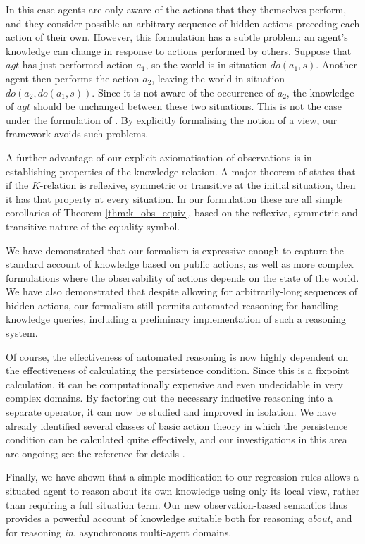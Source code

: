 In this case agents are only aware of the actions that they themselves
perform, and they consider possible an arbitrary sequence of hidden
actions preceding each action of their own. However, this formulation
has a subtle problem: an agent's knowledge can change in response
to actions performed by others. Suppose that $agt$ has just performed
action $a_{1}$, so the world is in situation $do(a_{1},s)$. Another
agent then performs the action $a_{2}$, leaving the world in situation
$do(a_{2},do(a_{1},s))$. Since it is not aware of the occurrence
of $a_{2}$, the knowledge of $agt$ should be unchanged between these
two situations. This is not the case under the formulation of \citeauthor{Lesperance99sitcalc_approach}.
By explicitly formalising the notion of a view, our framework avoids
such problems.

A further advantage of our explicit axiomatisation of observations
is in establishing properties of the knowledge relation. A major theorem
of \citet{scherl03sc_knowledge} states that if the $K$-relation
is reflexive, symmetric or transitive at the initial situation, then
it has that property at every situation. In our formulation these
are all simple corollaries of Theorem \ref{thm:k_obs_equiv}, based
on the reflexive, symmetric and transitive nature of the equality
symbol.

We have demonstrated that our formalism is expressive enough to capture
the standard account of knowledge based on public actions, as well
as more complex formulations where the observability of actions depends
on the state of the world. We have also demonstrated that despite
allowing for arbitrarily-long sequences of hidden actions, our formalism
still permits automated reasoning for handling knowledge queries,
including a preliminary implementation of such a reasoning system.

Of course, the effectiveness of automated reasoning is now highly
dependent on the effectiveness of calculating the persistence condition.
Since this is a fixpoint calculation, it can be computationally expensive
and even undecidable in very complex domains. By factoring out the
necessary inductive reasoning into a separate operator, it can now
be studied and improved in isolation. We have already identified several
classes of basic action theory in which the persistence condition
can be calculated quite effectively, and our investigations in this
area are ongoing; see the reference for details \citep{kelly07sc_persistence}.

Finally, we have shown that a simple modification to our regression
rules allows a situated agent to reason about its own knowledge using
only its local view, rather than requiring a full situation term.
Our new observation-based semantics thus provides a powerful account
of knowledge suitable both for reasoning \emph{about}, and for reasoning
\emph{in}, asynchronous multi-agent domains.

